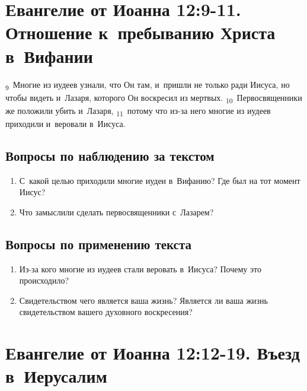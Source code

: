\documentclass[a4paper,12pt]{article}
\begin{document}

\section{Евангелие от Иоанна 12:9-11. Отношение к~пребыванию Христа в~Вифании}

\textsubscript{9}~Многие из иудеев узнали, что Он там, и~пришли не только ради Иисуса, но чтобы видеть и~Лазаря, которого Он воскресил из мертвых. \textsubscript{10}~Первосвященники же положили убить и~Лазаря, \textsubscript{11}~потому что из-за него многие из иудеев приходили и~веровали в~Иисуса.

\subsection*{Вопросы по наблюдению за текстом}
\begin{enumerate}
    \item С~какой целью приходили многие иудеи в~Вифанию? Где был на тот момент Иисус? 
    
    \myline
    
    \myline
    \item Что замыслили сделать первосвященники с~Лазарем? 
    
    \myline
    
    \myline
\end{enumerate}

\subsection*{Вопросы по применению текста} 
\begin{enumerate}
    \item Из-за кого многие из иудеев стали веровать в~Иисуса? Почему это происходило? 
    
    \myline
    
    \myline
    \item Свидетельством чего является ваша жизнь? Является ли ваша жизнь свидетельством вашего духовного воскресения? 
    
    \myline
    
    \myline
\end{enumerate}



\section{Евангелие от Иоанна 12:12-19. Въезд в~Иерусалим}
\end{document}
